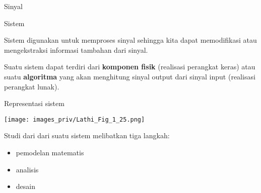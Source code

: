 \begin{frame}{Sinyal}

\end{frame}


\begin{frame}{Sistem}

Sistem digunakan untuk memproses sinyal sehingga kita dapat memodifikasi atau
mengekstraksi informasi tambahan dari sinyal.

Suatu sistem dapat terdiri dari \textbf{komponen fisik} (realisasi
perangkat keras)
atau suatu \textbf{algoritma} yang akan menghitung sinyal output dari
sinyal input (realisasi perangkat lunak).

\end{frame}



\begin{frame}{Representasi sistem}

{\centering
\texttt{[image: images\_priv/Lathi\_Fig\_1\_25.png]}
\par}

\end{frame}


\begin{frame}

Studi dari dari suatu sistem melibatkan tiga langkah:
\begin{itemize}
\item pemodelan matematis
\item analisis
\item desain
\end{itemize}

\end{frame}



